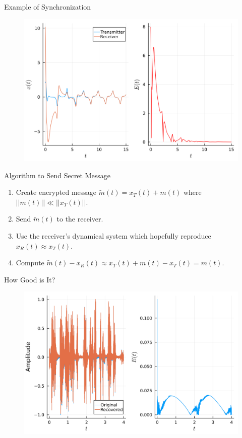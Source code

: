 \documentclass{beamer}
\begin{document}
\begin{frame}{Example of Synchronization}
    \begin{figure}[H]
        \includegraphics[width=\linewidth,height=\textheight,keepaspectratio]{combined_plot.png}
        \centering
    \end{figure}
\end{frame}


\begin{frame}{Algorithm to Send Secret Message}
    \begin{enumerate}
        \item Create encrypted message $\widetilde{m}(t) = x_T (t) + m(t)$ where $||m(t)|| \ll ||x_T(t)||$. 
        \item Send $\widetilde{m}(t)$ to the receiver. 
        \item Use the receiver's dynamical system which hopefully reproduce $x_R(t) \approx x_T(t)$. 
        \item Compute $\widetilde{m}(t) - x_R(t) \approx x_T (t) + m(t) - x_T(t) = m(t)$. 
    \end{enumerate}
\end{frame}

\begin{frame}{How Good is It?}
    \begin{figure}[H]
        \includegraphics[width=\linewidth,height=\textheight,keepaspectratio]{combined_error_sound_plot.png}
        \centering
    \end{figure}
\end{frame}
\end{document}

